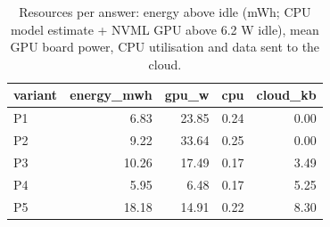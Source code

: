 \begin{table}[htbp]
\centering
\small
\caption{Resources per answer: energy above idle (mWh; CPU model estimate + NVML GPU above 6.2 W idle), mean GPU board power, CPU utilisation and data sent to the cloud.}
\label{tab:resources_by_policy}
\begin{tabular}{l r r r r}
\toprule
variant & energy\_mwh & gpu\_w & cpu & cloud\_kb \\
\midrule
P1 & 6.83 & 23.85 & 0.24 & 0.00 \\
P2 & 9.22 & 33.64 & 0.25 & 0.00 \\
P3 & 10.26 & 17.49 & 0.17 & 3.49 \\
P4 & 5.95 & 6.48 & 0.17 & 5.25 \\
P5 & 18.18 & 14.91 & 0.22 & 8.30 \\
\bottomrule
\end{tabular}
\end{table}
